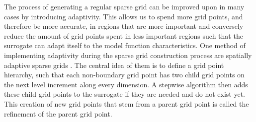 \documentclass[
  a4paper,  %
  twoside,  %
  bibliography=totoc,
  headsepline,
  cleardoublepage=empty,
  parskip=half,
  draft=false
]{scrbook}
\begin{document}
The process of generating a regular sparse grid can be improved upon in many cases by introducing adaptivity.
This allows us to spend more grid points, and therefore be more accurate, in regions that are more important and conversely reduce the amount of grid points spent in less important regions such that the surrogate can adapt itself to the model function characteristics.
One method of implementing adaptivity during the sparse grid construction process are spatially adaptive sparse grids \cite{Pflueger2012}.
The central idea of them is to define a grid point hierarchy, such that each non-boundary grid point has two child grid points on the next level increment along every dimension.
A stepwise algorithm then adds these child grid points to the surrogate if they are needed and do not exist yet.
This creation of new grid points that stem from a parent grid point is called the refinement of the parent grid point.
\end{document}
